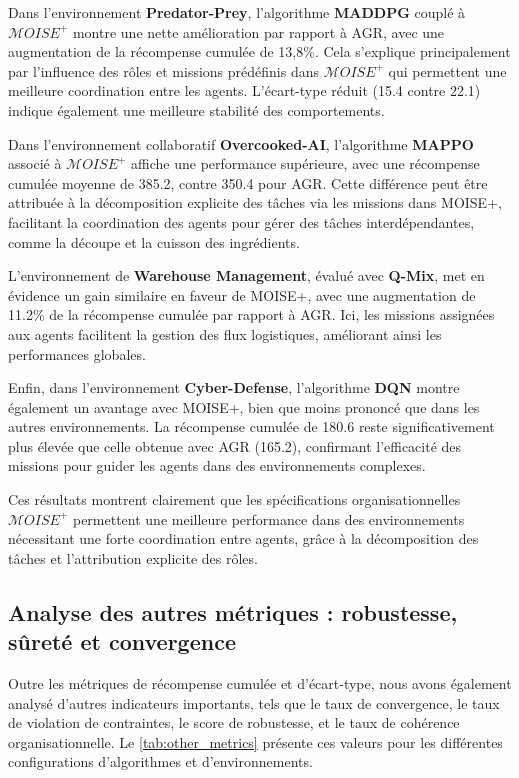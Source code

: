 \documentclass[sigconf,anonymous]{aamas}
\begin{document}
Dans l'environnement \textbf{Predator-Prey}, l'algorithme \textbf{MADDPG} couplé à $\mathcal{M}OISE^+$ montre une nette amélioration par rapport à AGR, avec une augmentation de la récompense cumulée de 13,8\%. Cela s'explique principalement par l'influence des rôles et missions prédéfinis dans $\mathcal{M}OISE^+$ qui permettent une meilleure coordination entre les agents. L'écart-type réduit (15.4 contre 22.1) indique également une meilleure stabilité des comportements.

Dans l'environnement collaboratif \textbf{Overcooked-AI}, l'algorithme \textbf{MAPPO} associé à $\mathcal{M}OISE^+$ affiche une performance supérieure, avec une récompense cumulée moyenne de 385.2, contre 350.4 pour AGR. Cette différence peut être attribuée à la décomposition explicite des tâches via les missions dans MOISE+, facilitant la coordination des agents pour gérer des tâches interdépendantes, comme la découpe et la cuisson des ingrédients.

L'environnement de \textbf{Warehouse Management}, évalué avec \textbf{Q-Mix}, met en évidence un gain similaire en faveur de MOISE+, avec une augmentation de 11.2\% de la récompense cumulée par rapport à AGR. Ici, les missions assignées aux agents facilitent la gestion des flux logistiques, améliorant ainsi les performances globales.

Enfin, dans l'environnement \textbf{Cyber-Defense}, l'algorithme \textbf{DQN} montre également un avantage avec MOISE+, bien que moins prononcé que dans les autres environnements. La récompense cumulée de 180.6 reste significativement plus élevée que celle obtenue avec AGR (165.2), confirmant l'efficacité des missions pour guider les agents dans des environnements complexes.

Ces résultats montrent clairement que les spécifications organisationnelles $\mathcal{M}OISE^+$ permettent une meilleure performance dans des environnements nécessitant une forte coordination entre agents, grâce à la décomposition des tâches et l'attribution explicite des rôles.

\subsection{Analyse des autres métriques : robustesse, sûreté et convergence}

Outre les métriques de récompense cumulée et d'écart-type, nous avons également analysé d'autres indicateurs importants, tels que le taux de convergence, le taux de violation de contraintes, le score de robustesse, et le taux de cohérence organisationnelle. Le \autoref{tab:other_metrics} présente ces valeurs pour les différentes configurations d'algorithmes et d'environnements.
\end{document}
